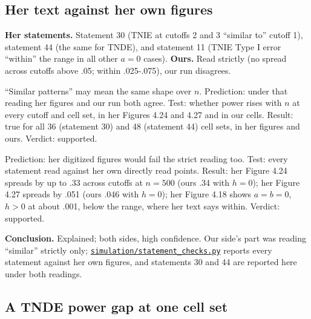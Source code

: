 \subsection{Her text against her own figures}\label{dis:prose-versus-own-figure}

\textbf{Her statements.} Statement 30 (TNIE at cutoffs 2 and 3 ``similar to'' cutoff 1), statement 44 (the same for TNDE), and statement 11 (TNIE Type I error ``within'' the range in all other $a = 0$ cases). \textbf{Ours.} Read strictly (no spread across cutoffs above .05; within .025-.075), our run disagrees.
\begin{description}[leftmargin=1em,style=nextline]
\item[Our reading is too strict (ours).] ``Similar patterns'' may mean the same shape over $n$. Prediction: under that reading her figures and our run both agree. Test: whether power rises with $n$ at every cutoff and cell set, in her Figures 4.24 and 4.27 and in our cells. Result: true for all 36 (statement 30) and 48 (statement 44) cell sets, in her figures and ours. Verdict: supported.
\item[Her text contradicts her own figures (source).] Prediction: her digitized figures would fail the strict reading too. Test: every statement read against her own directly read points. Result: her Figure 4.24 spreads by up to .33 across cutoffs at $n = 500$ (ours .34 with $h = 0$); her Figure 4.27 spreads by .051 (ours .046 with $h = 0$); her Figure 4.18 shows $a = b = 0$, $h > 0$ at about .001, below the range, where her text says within. Verdict: supported.
\end{description}
\textbf{Conclusion.} Explained; both sides, high confidence. Our side's part was reading ``similar'' strictly only; \href{https://github.com/alectionary/vibe-math/blob/master/formalization/chen-rdd-mediation/simulation/statement_checks.py}{\nolinkurl{simulation/statement_checks.py}} reports every statement against her own figures, and statements 30 and 44 are reported here under both readings.

\subsection{A TNDE power gap at one cell set}\label{dis:tnde-power-gap}

